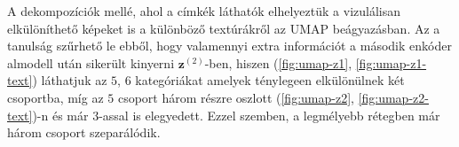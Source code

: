 \documentclass[12pt, english]{article}
\begin{document}
\vspace{4mm}

\par A dekompozíciók mellé, ahol a címkék láthatók elhelyeztük a vizulálisan elkülöníthető képeket is a különböző textúrákről az UMAP beágyazásban. Az a tanulság szűrhető le ebből, hogy valamennyi extra információt a második enkóder almodell után sikerült kinyerni $\bm{z}^{(2)}$-ben, hiszen (\ref{fig:umap-z1}, \ref{fig:umap-z1-text}) láthatjuk az $5$, $6$ kategóriákat amelyek ténylegeen elkülönülnek két csoportba, míg az $5$ csoport három részre oszlott (\ref{fig:umap-z2}, \ref{fig:umap-z2-text})-n és már $3$-assal is elegyedett. Ezzel szemben, a legmélyebb rétegben már három csoport szeparálódik.

\vspace{4mm}
\end{document}
